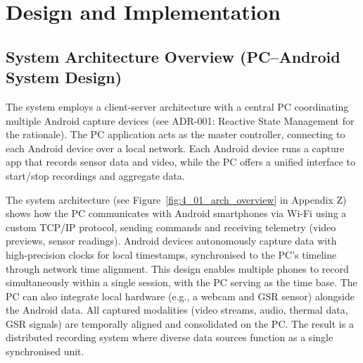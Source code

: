\chapter{Design and Implementation}\label{chap:design-implementation}

\section{System Architecture Overview (PC--Android System Design)}\label{sec:4-1}
The system employs a client-server architecture with a central PC coordinating multiple Android capture devices (see ADR-001: Reactive State Management for the rationale). The PC application acts as the master controller, connecting to each Android device over a local network. Each Android device runs a capture app that records sensor data and video, while the PC offers a unified interface to start/stop recordings and aggregate data.

The system architecture (see Figure~\ref{fig:4_01_arch_overview} in Appendix Z) shows how the PC communicates with Android smartphones via Wi-Fi using a custom TCP/IP protocol, sending commands and receiving telemetry (video previews, sensor readings). Android devices autonomously capture data with high-precision clocks for local timestamps, synchronised to the PC's timeline through network time alignment. This design enables multiple phones to record simultaneously within a single session, with the PC serving as the time base. The PC can also integrate local hardware (e.g., a webcam and GSR sensor) alongside the Android data. All captured modalities (video streams, audio, thermal data, GSR signals) are temporally aligned and consolidated on the PC. The result is a distributed recording system where diverse data sources function as a single synchronised unit.

